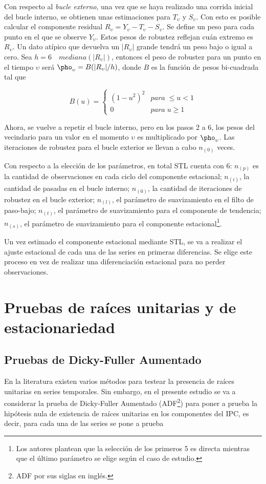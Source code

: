 Con respecto al \textit{bucle externo}, una vez que se haya realizado una corrida inicial del bucle interno, se obtienen unas estimaciones para $T_{\upsilon}$ y $S_{\upsilon}$. Con esto es posible calcular el componente residual $R_{\upsilon}=Y_{\upsilon}-T_{\upsilon}-S_{\upsilon}$. Se define un peso para cada punto en el que se observe $Y_{\upsilon}$. Estos pesos de robustez reflejan cuán extremo es $R_{\upsilon}$. Un dato atípico que devuelva un $|R_{\upsilon}|$ grande tendrá un peso bajo o igual a cero. Sea $h=6\quad mediana(|R_{\upsilon}|)$, entonces el peso de robustez para un punto en el tiempo $\upsilon$ será $\pho_{\upsilon}=B(|R_{\upsilon}|/h)$, donde $B$ es la función de pesos bi-cuadrada tal que

$$
B(u)=\begin{cases}
(1-u^{2})^{2} & para\;\leq u<1\\
0 & para\;u\geq1
\end{cases}
$$


Ahora, se vuelve a repetir el bucle interno, pero en los pasos 2 a 6,  los pesos del vecindario para un valor en el momento $\upsilon$ es multiplicado por $\pho_{\upsilon}$. Las iteraciones de robustez para el bucle exterior se llevan a cabo $n_{(0)}$ veces. 

Con respecto a la elección de los parámetros, en total STL cuenta con 6: $n_{(p)}$ es la cantidad de observaciones en cada ciclo del componente estacional; $n_{(i)}$, la cantidad de pasadas en el bucle interno; $n_{(0)}$, la cantidad de iteraciones de robustez en el bucle exterior; $n_{(l)}$, el parámetro de suavizamiento en el filto de paso-bajo; $n_{(t)}$, el parámetro de suavizamiento para el componente de tendencia; $n_{(s)}$, el parámetro de suavizamiento para el componente estacional\footnote{Los autores plantean que la selección de los primeros 5 es directa mientras que el último parámetro se elige según el caso de estudio.}. 


Un vez estimado el componente estacional mediante STL, se va a realizar el ajuste estacional de cada una de las series en primeras diferencias. Se elige este proceso en vez de realizar una diferenciación estacional para no perder observaciones.

 
\newpage
\section{Pruebas de raíces unitarias y de estacionariedad}
\label{sec: RU_esta}
\subsection{Pruebas de Dicky-Fuller Aumentado}
\label{sec: RU}
En la literatura existen varios métodos para testear la presencia de raíces unitarias en series temporales. Sin embargo, en el presente estudio se va a considerar la prueba de Dicky-Fuller Aumentado (ADF\footnote{ADF por sus siglas en inglés.}) para poner a prueba la hipótesis nula de existencia de raíces unitarias en los componentes del IPC, es decir, para cada una de las series se pone a prueba 

